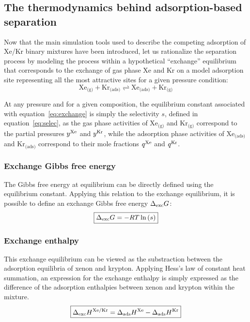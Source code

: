 \documentclass[main.tex]{subfiles}
\begin{document}
\subsection{The thermodynamics behind adsorption-based separation}\label{sct:thermo}

Now that the main simulation tools used to describe the competing adsorption of Xe/Kr binary mixtures have been introduced, let us rationalize the separation process by modeling the process within a hypothetical ``exchange'' equilibrium that corresponds to the exchange of gas phase Xe and Kr on a model adsorption site representing all the most attractive sites for a given pressure condition:
\begin{equation}\label{eq:exchange}
    \text{Xe}_{\text{(g)}} + \text{Kr}_{\text{(ads)}}
    \rightleftharpoons \text{Xe}_{\text{(ads)}} + \text{Kr}_{\text{(g)}}
\end{equation}

At any pressure and for a given composition, the equilibrium constant associated with equation~\ref{eq:exchange} is simply the selectivity $s$, defined in equation~\ref{eq:selec}, as the gas phase activities of $\text{Xe}_{\text{(g)}}$ and $\text{Kr}_{\text{(g)}}$ correspond to the partial pressures $y^{\text{Xe}}$ and $y^{\text{Kr}}$, while the adsorption phase activities of $\text{Xe}_{\text{(ads)}}$ and $\text{Kr}_{\text{(ads)}}$ correspond to their mole fractions $q^{\text{Xe}}$ and $q^{\text{Kr}}$. 

\subsubsection{Exchange Gibbs free energy}

The Gibbs free energy at equilibrium can be directly defined using the equilibrium constant. Applying this relation to the exchange equilibrium, it is possible to define an exchange Gibbs free energy $\Delta_{\text{exc}}G$:
\begin{equation}\label{eq:exc_gibbs_free_energy}
  \boxed{
  \Delta_{\text{exc}}G = -RT \ln\left(s\right)
  }
\end{equation}

\subsubsection{Exchange enthalpy}

This exchange equilibrium can be viewed as the substraction between the adsorption equilibria of xenon and krypton. Applying Hess's law of constant heat summation, an expression for the exchange enthalpy is simply expressed as the difference of the adsorption enthalpies between xenon and krypton within the mixture. 
\begin{equation}
  \boxed{
  \Delta_{\text{exc}}H^{\text{Xe/Kr}} = \Delta_{\text{ads}}H^{\text{Xe}} - \Delta_{\text{ads}}H^{\text{Kr}}
  }
\end{equation}
\end{document}
